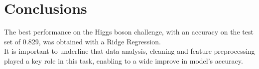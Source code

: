 \documentclass[10pt,conference,compsocconf]{IEEEtran}
\begin{document}
\section{Conclusions}
The best performance on the Higgs boson
challenge, with an accuracy on the test set of
0.829, was obtained with a Ridge Regression.\\
It is important to underline that data analysis, cleaning and feature preprocessing played a key role in this task, enabling to a wide improve in model's accuracy.\\





\end{document}
